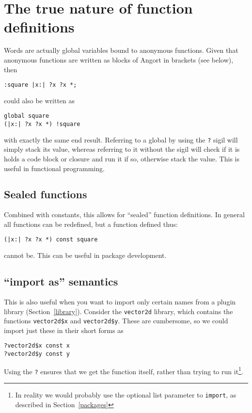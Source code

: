 



\section{The true nature of function definitions}
\label{globdetails}
Words are actually global variables bound to anonymous functions.
Given that anonymous functions are written as blocks of Angort
in brackets (see below), then
\begin{lstlisting}
:square |x:| ?x ?x *;
\end{lstlisting}
could also be written as
\begin{lstlisting}
global square
(|x:| ?x ?x *) !square
\end{lstlisting}
with exactly the same end result. Referring to a global by using the \texttt{?} sigil
will simply stack its value, whereas referring to it without the sigil
will check if it is holds a code block or closure and run it if so, otherwise
stack the value. This is useful in functional programming.

\subsection{Sealed functions}
Combined with constants, this allows for ``sealed'' function definitions. 
In general all functions can be redefined, but a function defined thus:
\begin{lstlisting}
(|x:| ?x ?x *) const square
\end{lstlisting}
cannot be. This can be useful in package development.

\subsection{``import as'' semantics}
This is also useful when you want to import only certain names from
a plugin library (Section~\ref{library}). Consider the \texttt{vector2d} library, which contains
the functions \texttt{vector2d\$x} and \texttt{vector2d\$y}. These
are cumbersome, so we could import just these in their short forms
as
\begin{lstlisting}
?vector2d$x const x
?vector2d$y const y
\end{lstlisting}
Using the \texttt{?} ensures that we get the function itself, rather
than trying to run it\footnote{In reality we would probably use
the optional list parameter to \texttt{import}, as described in
Section~\ref{packages}}.

